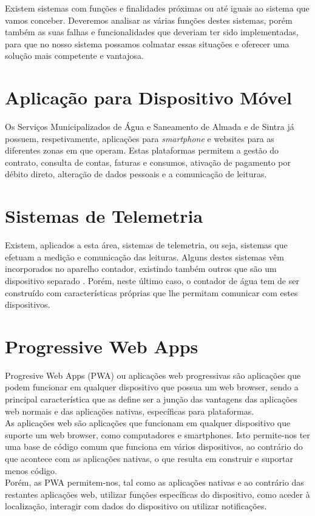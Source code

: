 Existem sistemas com funções e finalidades próximas ou até iguais ao sistema que vamos conceber. Deveremos analisar as várias funções destes sistemas, porém também as suas falhas e funcionalidades que deveriam ter sido implementadas, para que no nosso sistema possamos colmatar essas situações e oferecer uma solução mais competente e vantajosa.

\section{Aplicação para Dispositivo Móvel} \label{sec:appsmas}
Os Serviços Municipalizados de Água e Saneamento de Almada e de Sintra já possuem, respetivamente, aplicações para \textit{smartphone} \cite{smas:almada} e websites \cite{smas:sintra} para as diferentes zonas em que operam. Estas plataformas permitem a gestão do contrato, consulta de contas, faturas e consumos, ativação de pagamento por débito direto, alteração de dados pessoais e a comunicação de leituras.

\section{Sistemas de Telemetria} \label{sec:telemetria}
Existem, aplicados a esta área, sistemas de telemetria, ou seja, sistemas que efetuam a medição e comunicação das leituras. Alguns destes sistemas vêm incorporados no aparelho contador, existindo também outros que são um dispositivo separado \cite{janz:impji}. Porém, neste último caso, o contador de água tem de ser construído com características próprias que lhe permitam comunicar com estes dispositivos.

\section{Progressive Web Apps} \label{sec:pwa}
Progresive Web Apps (PWA) ou aplicações web progressivas são aplicações que podem funcionar em qualquer dispositivo que possua um web browser, sendo a principal característica que as define ser a junção das vantagens das aplicações web normais e das aplicações nativas, específicas para plataformas. \\
As aplicações web são aplicações que funcionam em qualquer dispositivo que suporte um web browser, como computadores e smartphones. Isto permite-nos ter uma base de código comum que funciona em vários dispositivos, ao contrário do que acontece com as aplicações nativas, o que resulta em construir e suportar menos código. \\
Porém, as PWA permitem-nos, tal como as aplicações nativas e ao contrário das restantes aplicações web, utilizar funções específicas do dispositivo, como aceder à localização, interagir com dados do dispositivo ou utilizar notificações. 

